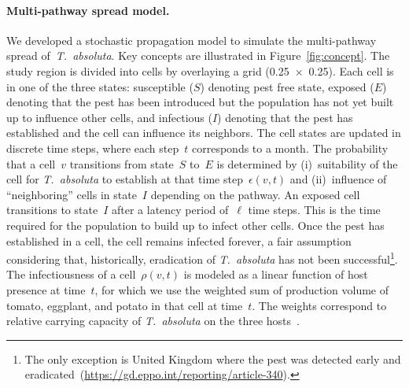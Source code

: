 \documentclass[11pt]{article}
\newcommand{\tuta}{\emph{T.~absoluta}}
\newcommand{\infest}{\rho}
\newcommand{\suitable}{\epsilon}
\theoremstyle{definition}
\begin{document}
\paragraph{Multi-pathway spread model.} We developed a stochastic
propagation model to simulate the multi-pathway spread of~\tuta{}.  Key
concepts are illustrated in Figure~\ref{fig:concept}.
The study region is
divided into cells by overlaying a grid
(0.25\textdegree~$\times$~0.25\textdegree). Each cell is in one of the
three states: susceptible ($S$) denoting pest free state, exposed ($E$)
denoting that the pest has been introduced but the population has not yet
built up to influence other cells, and infectious ($I$) denoting that the
pest has established and the cell can influence its neighbors. The cell
states are updated in discrete time steps, where each step~$t$ corresponds
to a month.  The probability that a cell~$v$ transitions from state~$S$
to~$E$ is determined by (i)~suitability of the cell for \tuta{} to
establish at that time step~$\suitable(v,t)$ and (ii)~influence of
``neighboring'' cells in state~$I$ depending on the pathway. An exposed
cell transitions to state~$I$ after a latency period of~$\ell$ time steps.
This is the time required for the population to build up to infect other
cells.  Once the pest has established in a cell, the cell remains infected
forever, a fair assumption considering that, historically, eradication of
\tuta{} has not been successful\footnote{The only exception is United
Kingdom where the pest was detected early and
eradicated~(\url{https://gd.eppo.int/reporting/article-340}).}.  The
infectiousness of a cell~$\infest(v,t)$ is modeled as a linear function of
host presence at time~$t$, for which we use the weighted sum of production
volume of tomato, eggplant, and potato in that cell at time~$t$. The
weights correspond to relative carrying capacity of \tuta{} on the three
hosts~\cite{sylla2018}.
\end{document}
